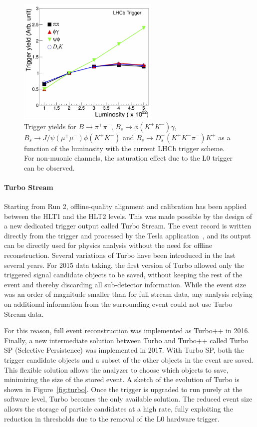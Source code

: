\begin{figure}[t]
\centerline{\includegraphics[width=0.6\textwidth]{figures/L0vsLumi.pdf}}
\caption{Trigger yields for ${B\to\pi^+\pi^-}$, ${B_s\to\phi(K^+K^-)\gamma}$, ${B_s\to J/\psi(\mu^+\mu^-)\phi(K^+K^-)}$ and ${B_s\to D_s^-(K^+K^-\pi^-)K^+}$ as a function of the luminosity with the current LHCb trigger scheme. For non-muonic channels, the saturation effect due to the L$0$ trigger can be observed.}
  \label{fig:triggervsLumi}
\end{figure}

\paragraph{Turbo Stream}

Starting from Run 2, offline-quality alignment and calibration has been applied between the HLT1 and the HLT2 levels. This was made possible by the design of a new dedicated trigger output called Turbo Stream. The event record is written directly from the trigger and processed by the Tesla application~\cite{Aaij:2016rxn}, and its output can be directly used for physics analysis without the need for offline reconstruction. Several variations of Turbo have been introduced in the last several
years. For 2015 data taking, the first version of Turbo allowed only the triggered signal candidate objects to be saved, without keeping the rest of the event and thereby discarding all sub-detector information. While the event size was an order of magnitude smaller than for full stream data, any analysis relying on additional information from the surrounding event could not use Turbo Stream data.

For this reason, full event reconstruction was implemented as Turbo++ in 2016. Finally, a new intermediate solution between Turbo and Turbo++ called Turbo SP (Selective Persistence) was implemented in 2017. With Turbo SP, both the trigger candidate objects and a subset of the other objects in the event are saved. This flexible solution allows the analyzer to choose which objects to save, minimizing the size of the stored event. A sketch of the evolution of Turbo is shown in Figure~\ref{fig:turbo}. Once the trigger is upgraded to run purely at the software level, Turbo becomes the only available solution. The reduced event size allows the storage of particle candidates at a high rate, fully exploiting the reduction in \pt thresholds due to the removal of the L$0$ hardware trigger.

